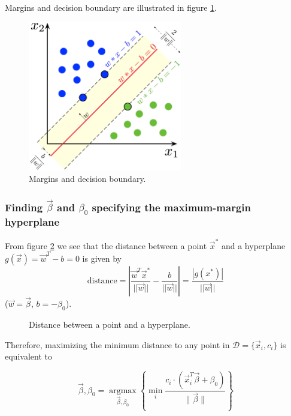 Margins and decision boundary are illustrated in figure \ref{fig:svm_margin}.

\begin{figure}[!htb]
    \centering
    \includegraphics[width=0.6\textwidth]{figures/svm_margin.png}
    \caption{Margins and decision boundary.}
    \label{fig:svm_margin}
\end{figure}

\subsubsection{Finding $\vec{\beta}$ and $\beta_0$ specifying the maximum-margin hyperplane}
From figure \ref{fig:dist_p_h} we see that the distance between a point $\vec{x}^*$ and
a hyperplane $g(\vec{x}) = \vec{w}^T - b = 0$ is given by
\begin{equation}
    \text{distance} = \left| \frac{\vec{w}^T\vec{x}^*}{||\vec{w}||} - \frac{b}{||\vec{w}||} \right| = \frac{|g(x^*)|}{||\vec{w}||}
\end{equation}
($\vec{w} = \vec{\beta}$, $b = -\beta_0$).

\begin{figure}[!htb]
    \centering
    
    \caption{Distance between a point and a hyperplane.}
    \label{fig:dist_p_h}
\end{figure}

Therefore, maximizing the minimum distance to any point in $\mathcal{D} = \{ \vec{x}_i, c_i \}$ is equivalent to

\begin{equation}
    \label{eq:svm_optimization_problem}
    \vec{\beta}, \beta_0=\underset{\vec{\beta}, \beta_0}{\operatorname{argmax}}\left\{\min _i \frac{c_i \cdot\left(\vec{x}_i^T \vec{\beta}+\beta_0\right)}{\|\vec{\beta}\|}\right\}
\end{equation}

